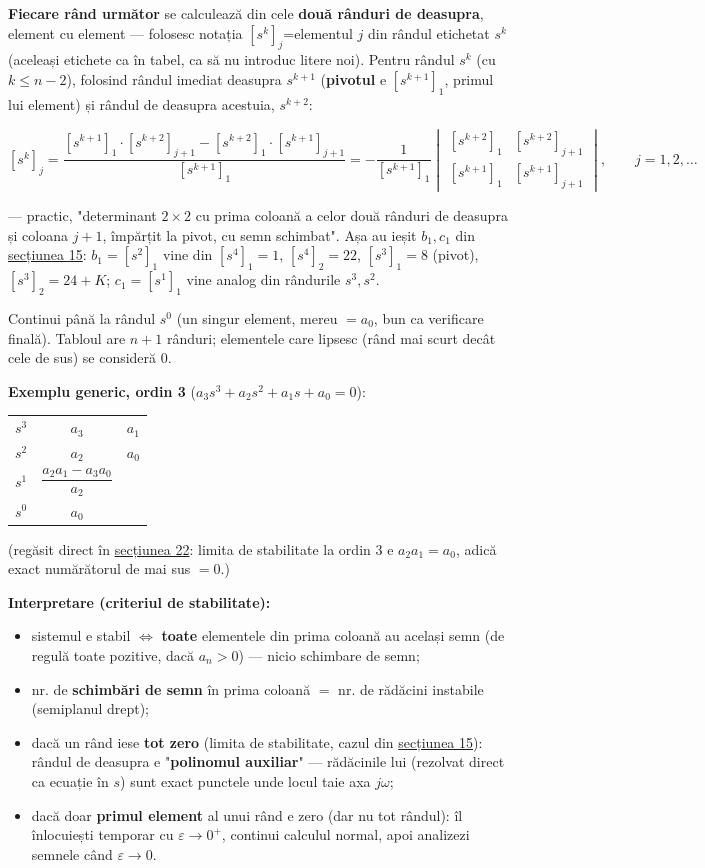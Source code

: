 \documentclass[10pt,a4paper]{article}
\begin{document}
\textbf{Fiecare rând următor} se calculează din cele \textbf{două rânduri de deasupra}, element cu element — folosesc notația $[s^k]_j${=}elementul $j$ din rândul etichetat $s^k$ (aceleași etichete ca în tabel, ca să nu introduc litere noi). Pentru rândul $s^k$ (cu $k\le n{-}2$), folosind rândul imediat deasupra $s^{k+1}$ (\textbf{pivotul} e $[s^{k+1}]_1$, primul lui element) și rândul de deasupra acestuia, $s^{k+2}$:
\begin{keyeq}\color{red!65!black}
$$[s^k]_j=\dfrac{[s^{k+1}]_1\cdot[s^{k+2}]_{j+1}-[s^{k+2}]_1\cdot[s^{k+1}]_{j+1}}{[s^{k+1}]_1}=-\dfrac1{[s^{k+1}]_1}\begin{vmatrix}[s^{k+2}]_1 & [s^{k+2}]_{j+1}\\ [s^{k+1}]_1 & [s^{k+1}]_{j+1}\end{vmatrix},\qquad j=1,2,\dots$$
\end{keyeq}
— practic, "determinant $2\times2$ cu prima coloană a celor două rânduri de deasupra și coloana $j{+}1$, împărțit la pivot, cu semn schimbat". Așa au ieșit $b_1,c_1$ din \hyperref[sec:15]{secțiunea 15}: $b_1{=}[s^2]_1$ vine din $[s^4]_1{=}1$, $[s^4]_2{=}22$, $[s^3]_1{=}8$ (pivot), $[s^3]_2{=}24{+}K$; $c_1{=}[s^1]_1$ vine analog din rândurile $s^3,s^2$.

Continui până la rândul $s^0$ (un singur element, mereu $=a_0$, bun ca verificare finală). Tabloul are $n{+}1$ rânduri; elementele care lipsesc (rând mai scurt decât cele de sus) se consideră $0$.

\textbf{Exemplu generic, ordin 3} ($a_3s^3+a_2s^2+a_1s+a_0=0$):
\begin{center}
\begin{tabular}{c|cc}
$s^3$ & $a_3$ & $a_1$\\
$s^2$ & $a_2$ & $a_0$\\
$s^1$ & $\dfrac{a_2a_1-a_3a_0}{a_2}$ & \\
$s^0$ & $a_0$ &
\end{tabular}
\end{center}
(regăsit direct în \hyperref[sec:22]{secțiunea 22}: limita de stabilitate la ordin 3 e $a_2a_1{=}a_0$, adică exact numărătorul de mai sus $=0$.)

\textbf{Interpretare (criteriul de stabilitate):}
\begin{itemize}
\item sistemul e stabil $\iff$ \textbf{toate} elementele din prima coloană au același semn (de regulă toate pozitive, dacă $a_n{>}0$) — nicio schimbare de semn;
\item nr. de \textbf{schimbări de semn} în prima coloană $=$ nr. de rădăcini instabile (semiplanul drept);
\item dacă un rând iese \textbf{tot zero} (limita de stabilitate, cazul din \hyperref[sec:15]{secțiunea 15}): rândul de deasupra e "\textbf{polinomul auxiliar}" — rădăcinile lui (rezolvat direct ca ecuație în $s$) sunt exact punctele unde locul taie axa $j\omega$;
\item dacă doar \textbf{primul element} al unui rând e zero (dar nu tot rândul): îl înlocuiești temporar cu $\varepsilon{\to}0^+$, continui calculul normal, apoi analizezi semnele când $\varepsilon\to0$.
\end{itemize}
\end{document}
